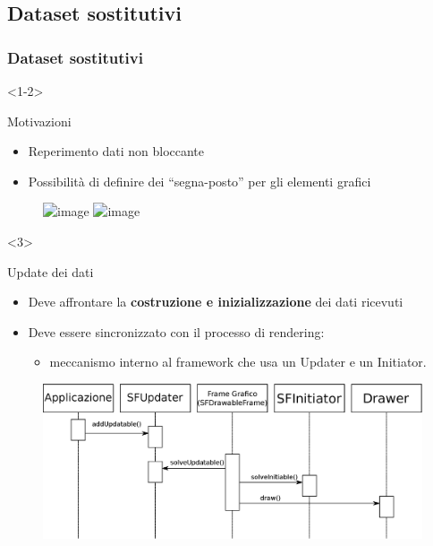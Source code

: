 \documentclass[ignorenonframetext,8pt]{beamer}
\begin{document}
	\subsection{Dataset sostitutivi}
	\begin{frame}
		\frametitle{Dataset sostitutivi}
		\begin{onlyenv}
			\begin{block}{Motivazioni}
				\begin{itemize}
					\item Reperimento dati non bloccante
					\item Possibilit\`a di definire dei ``segna-posto'' per gli elementi grafici
				\end{itemize}
			\end{block}
			\begin{center}
				\begin{figure}
					\includegraphics<1>[width=.90\textwidth]{Immagini/sequenzaDatiSost}
					\includegraphics<2>[width=.90\textwidth]{Immagini/sequenzaDatiSost2}
				\end{figure}
			\end{center}
		\end{onlyenv}
		\begin{onlyenv}<3>
			\begin{block}{Update dei dati}
				\begin{itemize}
					\item Deve affrontare la \textbf{costruzione e inizializzazione} dei dati ricevuti
					\item Deve essere sincronizzato con il processo di rendering:
						\begin{itemize}
							\item meccanismo interno al framework che usa un Updater e un Initiator.
						\end{itemize}
				\end{itemize}
			\end{block}
			\begin{center}
				\begin{figure}
					\includegraphics[width=.80\textwidth]{Immagini/sequenzaUpdatable}
				\end{figure}
			\end{center}
		\end{onlyenv}
	\end{frame}
\end{document}
